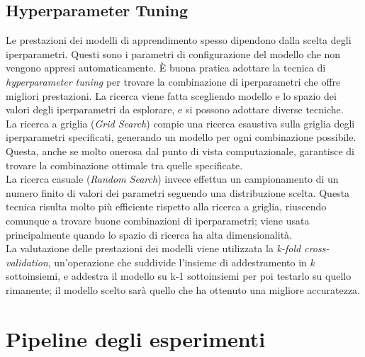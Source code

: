 \subsection{Hyperparameter Tuning}\label{subsec:tuning}
Le prestazioni dei modelli di apprendimento spesso dipendono dalla scelta degli iperparametri. Questi sono i parametri di configurazione del modello che non vengono appresi automaticamente. È buona pratica adottare la tecnica di \textit{hyperparameter tuning} per trovare la combinazione di iperparametri che offre migliori prestazioni.
La ricerca viene fatta scegliendo modello e lo spazio dei valori degli iperparametri da esplorare, e si possono adottare diverse tecniche.\\
La ricerca a griglia (\textit{Grid Search}) compie una ricerca esaustiva sulla griglia degli iperparametri specificati, generando un modello per ogni combinazione possibile. Questa, anche se molto onerosa dal punto di vista computazionale, garantisce di trovare la combinazione ottimale tra quelle specificate.\\
La ricerca casuale (\textit{Random Search}) invece effettua un campionamento di un numero finito di valori dei parametri seguendo una distribuzione scelta. Questa tecnica risulta molto più efficiente rispetto alla ricerca a griglia, riuscendo comunque a trovare buone combinazioni di iperparametri; viene usata principalmente quando lo spazio di ricerca ha alta dimensionalità.\\
La valutazione delle prestazioni dei modelli viene utilizzata la \textit{k-fold cross-validation}, un'operazione che suddivide l'insieme di addestramento in $k$ sottoinsiemi, e addestra il modello su k-1 sottoinsiemi per poi testarlo su quello rimanente; il modello scelto sarà quello che ha ottenuto una migliore accuratezza.
\section{Pipeline degli esperimenti}\label{sec:pipeline}
